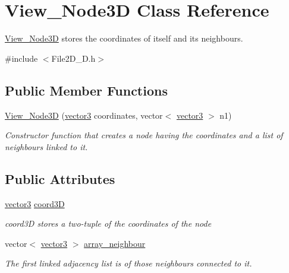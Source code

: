 \hypertarget{class_view___node3_d}{}\section{View\+\_\+\+Node3D Class Reference}
\label{class_view___node3_d}


\mbox{\hyperlink{class_view___node3_d}{View\+\_\+\+Node3D}} stores the coordinates of itself and its neighbours.  




{\ttfamily \#include $<$File2\+D\+\_\+D.\+h$>$}

\subsection*{Public Member Functions}
\begin{DoxyCompactItemize}
\item 
\mbox{\label{class_view___node3_d_a0c4bc516cb7e45d607df70f6c65ab841}} 
\mbox{\hyperlink{class_view___node3_d_a0c4bc516cb7e45d607df70f6c65ab841}{View\+\_\+\+Node3D}} (\mbox{\hyperlink{classvector3}{vector3}} coordinates, vector$<$ \mbox{\hyperlink{classvector3}{vector3}} $>$ n1)
\begin{DoxyCompactList}\small\item\em Constructor function that creates a node having the coordinates and a list of neighbours linked to it. \end{DoxyCompactList}\end{DoxyCompactItemize}
\subsection*{Public Attributes}
\begin{DoxyCompactItemize}
\item 
\mbox{\label{class_view___node3_d_a30b267db2cf267f2204dbf00f039d351}} 
\mbox{\hyperlink{classvector3}{vector3}} \mbox{\hyperlink{class_view___node3_d_a30b267db2cf267f2204dbf00f039d351}{coord3D}}
\begin{DoxyCompactList}\small\item\em coord3D stores a two-\/tuple of the coordinates of the node \end{DoxyCompactList}\item 
\mbox{\label{class_view___node3_d_a8db68f969894363661dfc8dde710039d}} 
vector$<$ \mbox{\hyperlink{classvector3}{vector3}} $>$ \mbox{\hyperlink{class_view___node3_d_a8db68f969894363661dfc8dde710039d}{array\+\_\+neighbour}}
\begin{DoxyCompactList}\small\item\em The first linked adjacency list is of those neighbours connected to it. \end{DoxyCompactList}\end{DoxyCompactItemize}


